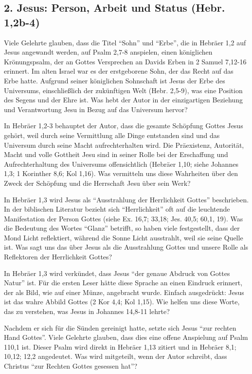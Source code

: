 \documentclass[]{book}
\begin{document}
\subsection{2. Jesus: Person, Arbeit und Status (Hebr.
1,2b-4)}\label{jesus-person-arbeit-und-status-hebr.-12b-4}

Viele Gelehrte glauben, dass die Titel ``Sohn'' und ``Erbe'', die in
Hebräer 1,2 auf Jesus angewandt werden, auf Psalm 2,7-8 anspielen, einen
königlichen Krönungspsalm, der an Gottes Versprechen an Davids Erben in
2 Samuel 7,12-16 erinnert. Im alten Israel war es der erstgeborene Sohn,
der das Recht auf das Erbe hatte. Aufgrund seiner königlichen Sohnschaft
ist Jesus der Erbe des Universums, einschließlich der zukünftigen Welt
(Hebr. 2,5-9), was eine Position des Segens und der Ehre ist. Was hebt
der Autor in der einzigartigen Beziehung und Verantwortung Jesu in Bezug
auf das Universum hervor?

In Hebräer 1,2-3 behauptet der Autor, dass die gesamte Schöpfung Gottes
Jesus gehört, weil durch seine Vermittlung alle Dinge entstanden sind
und das Universum durch seine Macht aufrechterhalten wird. Die
Präexistenz, Autorität, Macht und volle Gottheit Jesu sind in seiner
Rolle bei der Erschaffung und Aufrechterhaltung des Universums
offensichtlich (Hebräer 1,10; siehe Johannes 1,3; 1 Korinther 8,6; Kol
1,16). Was vermitteln uns diese Wahrheiten über den Zweck der Schöpfung
und die Herrschaft Jesu über sein Werk?

In Hebräer 1,3 wird Jesus als ``Ausstrahlung der Herrlichkeit Gottes''
beschrieben. In der biblischen Literatur bezieht sich ``Herrlichkeit''
oft auf die leuchtende Manifestation der Person Gottes (siehe Ex. 16,7;
33,18; Jes. 40,5; 60,1, 19). Was die Bedeutung des Wortes ``Glanz''
betrifft, so haben viele festgestellt, dass der Mond Licht reflektiert,
während die Sonne Licht ausstrahlt, weil sie seine Quelle ist. Was sagt
uns das über Jesus als die Ausstrahlung Gottes und unsere Rolle als
Reflektoren der Herrlichkeit Gottes?

In Hebräer 1,3 wird verkündet, dass Jesus ``der genaue Abdruck von
Gottes Natur'' ist. Für die ersten Leser hätte diese Sprache an einen
Eindruck erinnert, der als Bild, wie auf einer Münze, angebracht wurde.
Einfach ausgedrückt: Jesus ist das wahre Abbild Gottes (2 Kor 4,4; Kol
1,15). Wie helfen uns diese Worte, das zu verstehen, was Jesus in
Johannes 14,8-11 lehrte?

Nachdem er sich für die Sünden gereinigt hatte, setzte sich Jesus ``zur
rechten Hand Gottes''. Viele Gelehrte glauben, dass dies eine offene
Anspielung auf Psalm 110,1 ist. Dieser Psalm wird direkt in Hebräer 1,13
zitiert und in Hebräer 8,1; 10,12; 12,2 angedeutet. Was wird mitgeteilt,
wenn der Autor schreibt, dass Christus ``zur Rechten Gottes gesessen
hat''?
\end{document}
